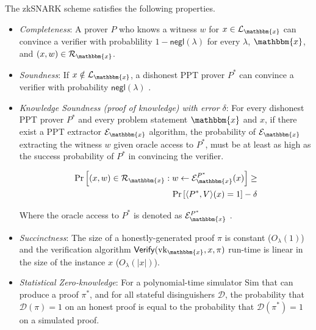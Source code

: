 \begin{definition}
	\label{def:zkSNARK Properties}
	
	The zkSNARK scheme satisfies the following properties.
	
	\begin{itemize}
		\item \textit{Completeness}: A prover $P$ who knows a witness $w$ for $x\in \mathcal{L}_\mathbbm{x}$ can convince a verifier with probablility $1-\mathsf{negl}(\lambda)$ for every $\lambda$, $\mathbbm{x}$, and $(x, w) \in \mathcal{R}_\mathbbm{x}$.
		
		\item \textit{Soundness}: If  $x \notin \mathcal{L}_\mathbbm{x}$, a dishonest PPT prover $P^*$ can convince a verifier with probability $\mathsf{negl}(\lambda)$ .
		
		\item \textit{Knowledge Soundness (proof of knowledge) with error $\delta$}: For every dishonest PPT prover $P^*$ and every problem statement $\mathbbm{x}$ and $x$, if there exist a PPT extractor $\mathcal{E}_\mathbbm{x}$ algorithm, the probability of $\mathcal{E}_\mathbbm{x}$ extracting the witness $w$ given oracle access to $P^*$, must be at least as high as the success probability of $P^*$ in convincing the verifier.
		
		\begin{align*}
			\Pr\left[(x, w) \in \mathcal{R}_\mathbbm{x}: w \leftarrow \mathcal{E}_\mathbbm{x}^{P^*}(x)\right] \geq \\
			\Pr \left[ \langle P^*, V \rangle (x) = 1 \right] - \delta
		\end{align*}
		
		Where the oracle access to $P^*$ is denoted as $\mathcal{E}_\mathbbm{x}^{P^*}$ \cite{Bellare1993ProofsofKnowledge}.
		
		\item \textit{Succinctness}: The size of a honestly-generated proof $\pi$ is constant ($O_\lambda(1)$) and the verification algorithm $\mathsf{Verify}(\text{vk}_\mathbbm{x}, x, \pi)$ run-time is linear in the size of the instance $x$ ($O_\lambda(|x|)$).
		
		\item \textit{Statistical Zero-knowledge}: For a polynomial-time simulator \textsf{Sim} that can produce a proof $\pi^*$, and for all stateful disinguishers $\mathcal{D}$, the probability  that $\mathcal{D}(\pi)=1$ on an honest proof is equal to the probability that $\mathcal{D}(\pi^*)=1$ on a simulated proof.    
	\end{itemize}
	
\end{definition}


